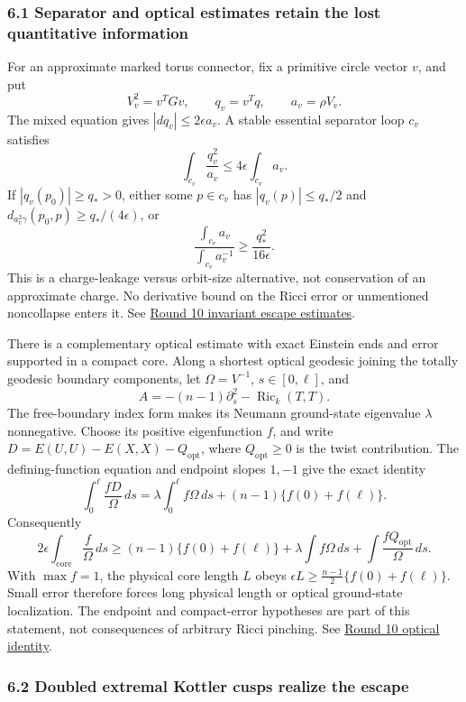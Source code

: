 \documentclass[
  english,
]{article}
\begin{document}
\hypertarget{separator-and-optical-estimates-retain-the-lost-quantitative-information}{%
\subsubsection{6.1 Separator and optical estimates retain the lost
quantitative
information}\label{separator-and-optical-estimates-retain-the-lost-quantitative-information}}

For an approximate marked torus connector, fix a primitive circle vector
\(v\), and put \[
 V_v^2=v^TGv,\qquad q_v=v^Tq,\qquad a_v=\rho V_v.
\] The mixed equation gives \(|dq_v|\le2\epsilon a_v\). A stable
essential separator loop \(c_v\) satisfies \[
 \int_{c_v}\frac{q_v^2}{a_v}\le4\epsilon\int_{c_v}a_v.
\] If \(|q_v(p_0)|\ge q_*>0\), either some \(p\in c_v\) has
\(|q_v(p)|\le q_*/2\) and \(d_{a_v^2\gamma}(p_0,p)\ge q_*/(4\epsilon)\),
or \[
 \frac{\int_{c_v}a_v}{\int_{c_v}a_v^{-1}}
       \ge\frac{q_*^2}{16\epsilon}.
\] This is a charge-leakage versus orbit-size alternative, not
conservation of an approximate charge. No derivative bound on the Ricci
error or unmentioned noncollapse enters it. See
\href{../proofs/round10_connector.md}{Round 10 invariant escape
estimates}.

There is a complementary optical estimate with exact Einstein ends and
error supported in a compact core. Along a shortest optical geodesic
joining the totally geodesic boundary components, let \(\Omega=V^{-1}\),
\(s\in[0,\ell]\), and \[
 A=-(n-1)\partial_s^2-\operatorname{Ric}_k(T,T).
\] The free-boundary index form makes its Neumann ground-state
eigenvalue \(\lambda\) nonnegative. Choose its positive eigenfunction
\(f\), and write \(D=E(U,U)-E(X,X)-Q_{\mathrm{opt}}\), where
\(Q_{\mathrm{opt}}\ge0\) is the twist contribution. The
defining-function equation and endpoint slopes \(1,-1\) give the exact
identity \[
 \int_0^\ell\frac{fD}{\Omega}\,ds
 =\lambda\int_0^\ell f\Omega\,ds+(n-1)\{f(0)+f(\ell)\}.
\] Consequently \[
 2\epsilon\int_{\mathrm{core}}\frac f\Omega\,ds
 \ge(n-1)\{f(0)+f(\ell)\}
       +\lambda\int f\Omega\,ds+\int\frac{fQ_{\mathrm{opt}}}{\Omega}\,ds.
\] With \(\max f=1\), the physical core length \(L\) obeys
\(\epsilon L\ge\frac{n-1}{2}\{f(0)+f(\ell)\}\). Small error therefore
forces long physical length or optical ground-state localization. The
endpoint and compact-error hypotheses are part of this statement, not
consequences of arbitrary Ricci pinching. See
\href{../proofs/round10_optical.md}{Round 10 optical identity}.

\hypertarget{doubled-extremal-kottler-cusps-realize-the-escape}{%
\subsubsection{6.2 Doubled extremal Kottler cusps realize the
escape}\label{doubled-extremal-kottler-cusps-realize-the-escape}}
\end{document}
